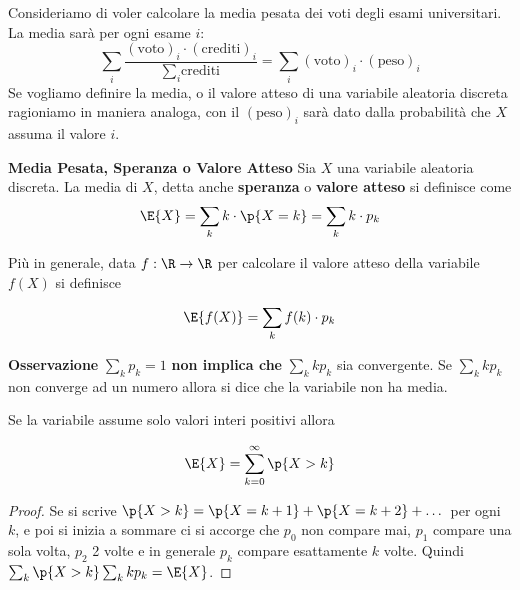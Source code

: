 Consideriamo di voler calcolare la media pesata dei voti degli esami
universitari. La media sar\`a  per ogni esame $ i $:
\begin{equation*}
    \sum_{i} \dfrac{(\text{voto})_i \cdot (\text{crediti})_i }{\sum_{i} \text{crediti}} = \sum_{i} (\text{voto})_i \cdot (\text{peso})_i
\end{equation*}
Se vogliamo definire la media, o il valore atteso di una variabile aleatoria
discreta ragioniamo in maniera analoga, con il $(\text{peso})_i$ sar\`a dato
dalla probabilit\`a che $X$ assuma il valore $i$.
\begin{defn}
    \textbf{Media Pesata, Speranza o Valore Atteso}
	Sia $ X $ una variabile aleatoria discreta. La media di $ X $, detta anche
	\textbf{speranza} o \textbf{valore atteso} si definisce come
    \begin{equation*}
    \E{X} = \sum_{k} k \cdot \p{X = k} = \sum_{k} k \cdot p_k
    \end{equation*}

    Pi\`u in generale, data  $ f : \R \to \R $ per calcolare il valore atteso
    della variabile $f(X)$ si definisce

    \begin{equation*}
    \E{f(X)} = \sum_{k} f(k) \cdot p_k
    \end{equation*}
\end{defn}
\textbf{Osservazione} $\sum_{k} p_k = 1 $ \textbf{non implica che} $ \sum_{k} k
p_k $ sia convergente. Se  $ \sum_{k} k p_k $ non converge ad un numero allora
si dice che la variabile non ha media.
\begin{prop}
Se la variabile assume solo valori interi positivi allora

\begin{equation}\label{Ex}
\E{X} = \sum_{k=0}^\infty \p{X > k}
\end{equation}
\end{prop}
\begin{proof}
    Se si scrive $ \p{X > k} =  \p{X = k+1} + \p{X = k+2} + \dots $ per ogni
$k$, e poi si inizia a sommare ci si accorge che $p_0$ non compare mai, $p_1$
compare una sola volta, $p_2$ 2 volte e in generale $p_k$ compare esattamente
$k$ volte. Quindi  $\sum_{k} \p{X > k}\sum_{k} k p_k=\E{X} $.
\end{proof}

